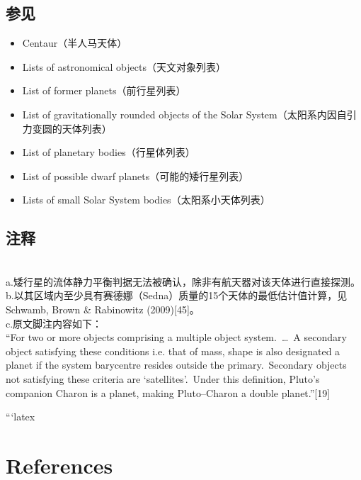 \subsection{参见}
\begin{itemize}
\item Centaur（半人马天体）\\
\item Lists of astronomical objects（天文对象列表）\\
\item List of former planets（前行星列表）\\
\item List of gravitationally rounded objects of the Solar System（太阳系内因自引力变圆的天体列表）\\
\item List of planetary bodies（行星体列表）\\
\item List of possible dwarf planets（可能的矮行星列表）\\
\item Lists of small Solar System bodies（太阳系小天体列表）
\end{itemize}
\subsection{注释}\\
a.矮行星的流体静力平衡判据无法被确认，除非有航天器对该天体进行直接探测。\\
b.以其区域内至少具有赛德娜（Sedna）质量的15个天体的最低估计值计算，见 Schwamb, Brown \& Rabinowitz (2009)[45]。\\
c.原文脚注内容如下：\\
“For two or more objects comprising a multiple object system.~…~A secondary object satisfying these conditions i.e. that of mass, shape is also designated a planet if the system barycentre resides outside the primary.~Secondary objects not satisfying these criteria are ‘satellites’.~Under this definition, Pluto’s companion Charon is a planet, making Pluto–Charon a double planet.”[19]

```latex
\section*{References}

